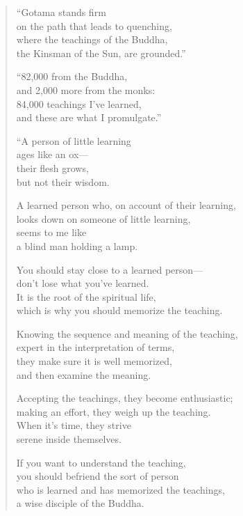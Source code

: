 \documentclass[12pt,openany]{book}%
\begin{document}
\begin{verse}
“Gotama stands firm \\
on the path that leads to quenching, \\
where the teachings of the Buddha, \\
the Kinsman of the Sun, are grounded.” 

“82,000 from the Buddha, \\
and 2,000 more from the monks: \\
84,000 teachings I’ve learned, \\
and these are what I promulgate.” 

“A person of little learning \\
ages like an ox—\\
their flesh grows, \\
but not their wisdom. 

A learned person who, on account of their learning, \\
looks down on someone of little learning, \\
seems to me like \\
a blind man holding a lamp. 

You should stay close to a learned person—\\
don’t lose what you’ve learned. \\
It is the root of the spiritual life, \\
which is why you should memorize the teaching. 

Knowing the sequence and meaning of the teaching, \\
expert in the interpretation of terms, \\
they make sure it is well memorized, \\
and then examine the meaning. 

Accepting the teachings, they become enthusiastic; \\
making an effort, they weigh up the teaching. \\
When it’s time, they strive \\
serene inside themselves. 

If you want to understand the teaching, \\
you should befriend the sort of person \\
who is learned and has memorized the teachings, \\
a wise disciple of the Buddha. 


\end{verse}
\end{document}
